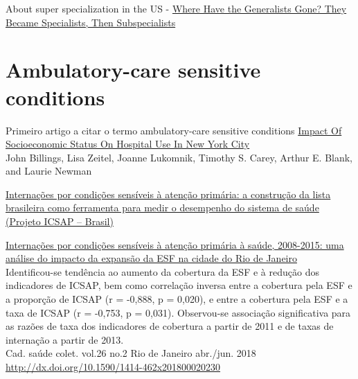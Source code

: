 \documentclass[]{book}
\begin{document}
About super specialization in the US -
\href{https://www.amjmed.com/article/S0002-9343\%2817\%2930134-1/pdf}{Where Have the Generalists Gone? They Became Specialists, Then Subspecialists}

\hypertarget{ambulatory-care-sensitive-conditions}{%
\section*{Ambulatory-care sensitive conditions}\label{ambulatory-care-sensitive-conditions}}

Primeiro artigo a citar o termo ambulatory-care sensitive conditions
\href{https://www.healthaffairs.org/doi/pdf/10.1377/hlthaff.12.1.162}{Impact Of Socioeconomic Status On Hospital Use In New York City}\\
John Billings, Lisa Zeitel, Joanne Lukomnik, Timothy S. Carey, Arthur E. Blank, and Laurie Newman

\href{http://www.scielo.br/pdf/csp/v25n6/16.pdf}{Internações por condições sensíveis à atenção primária: a construção da lista brasileira como ferramenta para medir o desempenho do sistema de saúde (Projeto ICSAP -- Brasil)}

\href{http://www.scielo.br/scielo.php?script=sci_arttext\&pid=S1414-462X2018000200178\&lng=pt\&nrm=iso\&tlng=pt}{Internações por condições sensíveis à atenção primária à saúde, 2008-2015: uma análise do impacto da expansão da ESF na cidade do Rio de Janeiro}\\
Identificou-se tendência ao aumento da cobertura da ESF e à redução dos indicadores de ICSAP, bem como correlação inversa entre a cobertura pela ESF e a proporção de ICSAP (r = -0,888, p = 0,020), e entre a cobertura pela ESF e a taxa de ICSAP (r = -0,753, p = 0,031). Observou-se associação significativa para as razões de taxa dos indicadores de cobertura a partir de 2011 e de taxas de internação a partir de 2013.\\
Cad. saúde colet. vol.26 no.2 Rio de Janeiro abr./jun. 2018 \url{http://dx.doi.org/10.1590/1414-462x201800020230}


\end{document}
